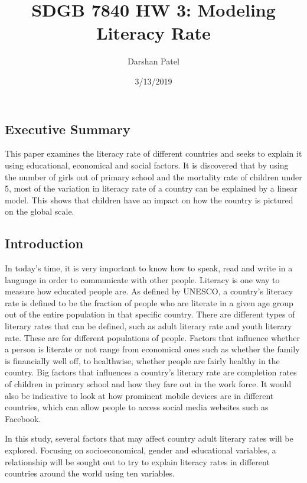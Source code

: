 \documentclass[]{article}
\title{SDGB 7840 HW 3: Modeling Literacy Rate}
\author{Darshan Patel}
\date{3/13/2019}
\begin{document}
\maketitle

\hypertarget{executive-summary}{%
\subsection{Executive Summary}\label{executive-summary}}

This paper examines the literacy rate of different countries and seeks
to explain it using educational, economical and social factors. It is
discovered that by using the number of girls out of primary school and
the mortality rate of children under 5, most of the variation in
literacy rate of a country can be explained by a linear model. This
shows that children have an impact on how the country is pictured on the
global scale.

\hypertarget{introduction}{%
\subsection{Introduction}\label{introduction}}

In today's time, it is very important to know how to speak, read and
write in a language in order to communicate with other people. Literacy
is one way to measure how educated people are. As defined by UNESCO, a
country's literacy rate is defined to be the fraction of people who are
literate in a given age group out of the entire population in that
specific country. There are different types of literary rates that can
be defined, such as adult literary rate and youth literary rate. These
are for different populations of people. Factors that influence whether
a person is literate or not range from economical ones such as whether
the family is financially well off, to healthwise, whether people are
fairly healthy in the country. Big factors that influences a country's
literary rate are completion rates of children in primary school and how
they fare out in the work force. It would also be indicative to look at
how prominent mobile devices are in different countries, which can allow
people to access social media websites such as Facebook.

In this study, several factors that may affect country adult literary
rates will be explored. Focusing on socioeconomical, gender and
educational variables, a relationship will be sought out to try to
explain literacy rates in different countries around the world using ten
variables.
\end{document}
